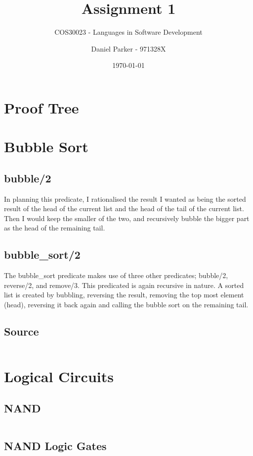 \documentclass[11pt, english, numbers=endperiod]{scrartcl}
\title{Assignment 1}
\subtitle{COS30023 - Languages in Software Development}
\author{Daniel Parker - 971328X}
\date{\today}
\begin{document}
\maketitle

\section{Proof Tree}


\section{Bubble Sort}
\subsection{bubble/2}
In planning this predicate, I rationalised the result I wanted as being the sorted result of the head of the current list and the head of the tail of the current list. Then I would keep the smaller of the two, and recursively bubble the bigger part as the head of the remaining tail.

\subsection{bubble\_sort/2}
The bubble\_sort predicate makes use of three other predicates; bubble/2, reverse/2, and remove/3. This predicated is again recursive in nature. A sorted list is created by bubbling, reversing the result, removing the top most element (head), reversing it back again and calling the bubble sort on the remaining tail.

\subsection{Source}
\inputminted[tabsize=4]{prolog}{bubblesort.pl}

\section{Logical Circuits}
\subsection{NAND}
\inputminted[firstline=3, lastline=7 ,tabsize=4]{prolog}{gates.pl}

\subsection{NAND Logic Gates}
\end{document}
